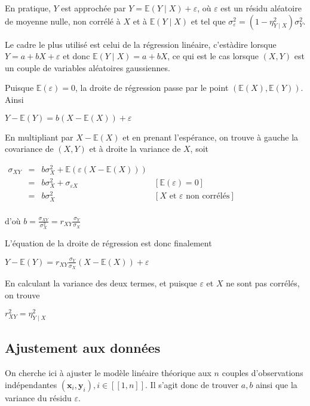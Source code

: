 \documentclass[letterpaper,10pt,french]{sphinxmanual}
\begin{document}
\sphinxAtStartPar
En pratique, \(Y\) est approchée par \(Y=\mathbb{E}(Y\mid X)+\varepsilon\), où \(\varepsilon\) est un résidu aléatoire de moyenne nulle, non corrélé à \(X\) et à \(\mathbb{E}(Y\mid X)\) et tel que \(\sigma_\varepsilon^2= (1-\eta_{Y\mid X}^2)\sigma_Y^2\).

\sphinxAtStartPar
Le cadre le plus utilisé est celui de la régression linéaire, c’est\sphinxhyphen{}à\sphinxhyphen{}dire lorsque \(Y=a+bX+\varepsilon\) et donc \(\mathbb{E}(Y\mid X)=a+bX\), ce qui est le cas lorsque \((X,Y)\) est un couple de variables aléatoires gaussiennes.

\sphinxAtStartPar
Puisque \(\mathbb{E}(\varepsilon)=0\), la droite de régression passe par le point \((\mathbb{E}(X),\mathbb{E}(Y))\). Ainsi

\sphinxAtStartPar
\(Y-\mathbb{E}(Y)=b(X-\mathbb{E}(X))+\varepsilon\)

\sphinxAtStartPar
En multipliant par \(X-\mathbb{E}(X)\) et en prenant l’espérance, on trouve à gauche la covariance de \((X,Y)\) et à droite la variance de \(X\), soit

\sphinxAtStartPar
\(\begin{array}{ccll}
\sigma_{XY}&=& b\sigma_X^2+\mathbb{E}(\varepsilon(X-\mathbb{E}(X)))&\\
&=& b\sigma_X^2 + \sigma_{\varepsilon X}&[\mathbb{E}(\varepsilon)=0]\\ 
&=& b\sigma_X^2 &[X\text{ et } \varepsilon\text{ non corrélés}]\\ 
\end{array}
\)

\sphinxAtStartPar
d’où
\(b = \frac{\sigma_{XY}}{\sigma_X^2} = r_{XY}\frac{\sigma_Y}{\sigma_X}\)

\sphinxAtStartPar
L’équation de la droite de régression est donc finalement

\sphinxAtStartPar
\(Y-\mathbb{E}(Y)=r_{XY}\frac{\sigma_Y}{\sigma_X}(X-\mathbb{E}(X))+\varepsilon\)

\sphinxAtStartPar
En calculant la variance des deux termes, et puisque \(\varepsilon\) et \(X\) ne sont pas corrélés, on trouve

\sphinxAtStartPar
\(r_{XY}^2 = \eta_{Y\mid X}^2\)


\subsection{Ajustement aux données}
\label{\detokenize{regression:ajustement-aux-donnees}}
\sphinxAtStartPar
On cherche ici à ajuster le modèle linéaire théorique aux \(n\) couples d’observations indépendantes \((\mathbf x_i,\mathbf y_i),i\in[\![1,n]\!]\). Il s’agit donc de trouver \(a,b\) ainsi que la variance du résidu \(\varepsilon\).
\end{document}
